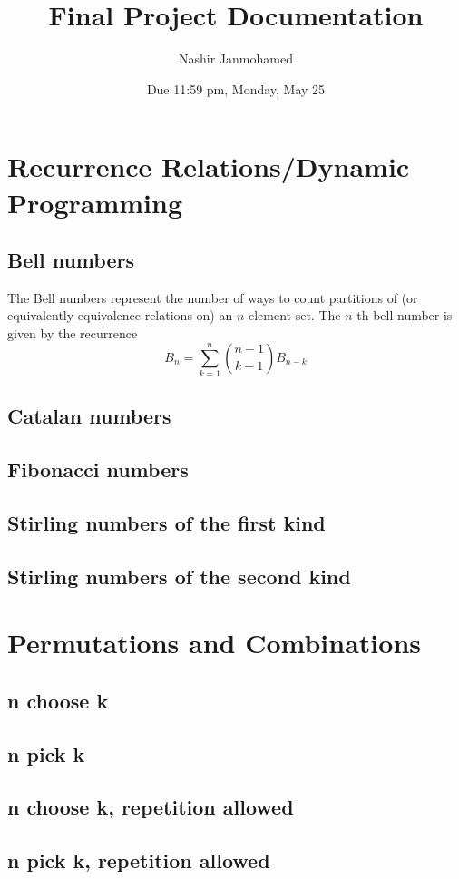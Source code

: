 \documentclass{article}
\title{Final Project Documentation}
\author{Nashir Janmohamed}
\date{Due 11:59 pm, Monday, May 25}
\begin{document}
\maketitle


\section{Recurrence Relations/Dynamic Programming}
\subsection{Bell numbers}
The Bell numbers represent the number of ways to count partitions of (or equivalently equivalence relations on) an $n$ element set. The $n$-th bell number is given by the recurrence
\[B_n = \sum_{k=1}^{n} {n-1 \choose k-1} B_{n-k}\]
\subsection{Catalan numbers}
\subsection{Fibonacci numbers}
\subsection{Stirling numbers of the first kind}
\subsection{Stirling numbers of the second kind}

\section{Permutations and Combinations}
\subsection{n choose k}
\subsection{n pick k}
\subsection{n choose k, repetition allowed}
\subsection{n pick k, repetition allowed}
\end{document}
